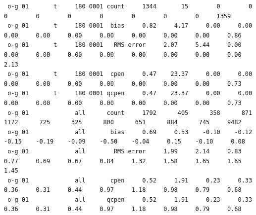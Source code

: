 \begin{itemize}[leftmargin=*]
\begin{tiny}
\begin{verbatim}
 o-g 01       t     180 0001 count     1344       15        0        0        0        0        0        0        0        0        0     1359
 o-g 01       t     180 0001  bias     0.82     4.17     0.00     0.00     0.00     0.00     0.00     0.00     0.00     0.00     0.00     0.86
 o-g 01       t     180 0001   RMS error     2.07     5.44     0.00     0.00     0.00     0.00     0.00     0.00     0.00     0.00     0.00     2.13
 o-g 01       t     180 0001  cpen     0.47    23.37     0.00     0.00     0.00     0.00     0.00     0.00     0.00     0.00     0.00     0.73
 o-g 01       t     180 0001 qcpen     0.47    23.37     0.00     0.00     0.00     0.00     0.00     0.00     0.00     0.00     0.00     0.73
 o-g 01             all      count     1792      405      358      871     1172      725      325      800      651      884      745     9482
 o-g 01             all       bias     0.69     0.53    -0.10    -0.12    -0.15    -0.19    -0.09    -0.50    -0.04     0.15    -0.10     0.08
 o-g 01             all        RMS error     1.99     2.14     0.83     0.77     0.69     0.67     0.84     1.32     1.58     1.65     1.65     1.45
 o-g 01             all       cpen     0.52     1.91     0.23     0.33     0.36     0.31     0.44     0.97     1.18     0.98     0.79     0.68
 o-g 01             all      qcpen     0.52     1.91     0.23     0.33     0.36     0.31     0.44     0.97     1.18     0.98     0.79     0.68




\end{verbatim}
\end{tiny}
\end{itemize}
